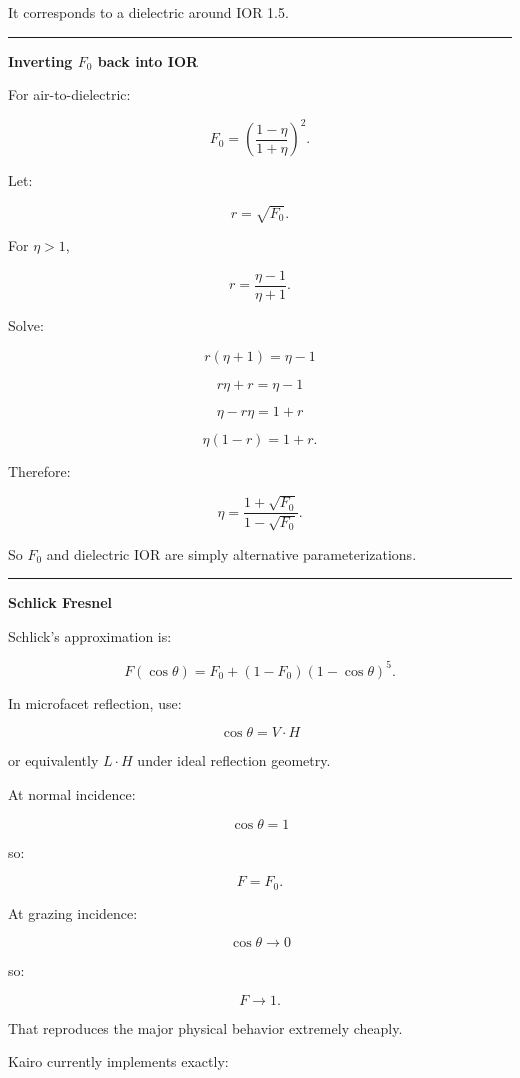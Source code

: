 It corresponds to a dielectric around IOR 1.5.

\begin{center}\rule{0.5\linewidth}{0.5pt}\end{center}

\textbf{Inverting \(F_0\) back into IOR}

For air-to-dielectric:

\[
F_0=
\left(
\frac{1-\eta}
{1+\eta}
\right)^2.
\]

Let:

\[
r=\sqrt{F_0}.
\]

For \(\eta>1\),

\[
r=
\frac{\eta-1}{\eta+1}.
\]

Solve:

\[
r(\eta+1)=\eta-1
\]

\[
r\eta+r=\eta-1
\]

\[
\eta-r\eta=1+r
\]

\[
\eta(1-r)=1+r.
\]

Therefore:

\[
\boxed{
\eta=
\frac{1+\sqrt{F_0}}
{1-\sqrt{F_0}}.
}
\]

So \(F_0\) and dielectric IOR are simply alternative parameterizations.

\begin{center}\rule{0.5\linewidth}{0.5pt}\end{center}

\textbf{Schlick Fresnel}

Schlick's approximation is:

\[
\boxed{
F(\cos\theta)
=
F_0
+
(1-F_0)(1-\cos\theta)^5.
}
\]

In microfacet reflection, use:

\[
\cos\theta=
V\cdot H
\]

or equivalently \(L\cdot H\) under ideal reflection geometry.

At normal incidence:

\[
\cos\theta=1
\]

so:

\[
F=F_0.
\]

At grazing incidence:

\[
\cos\theta\rightarrow0
\]

so:

\[
F\rightarrow1.
\]

That reproduces the major physical behavior extremely cheaply.

Kairo currently implements exactly:

